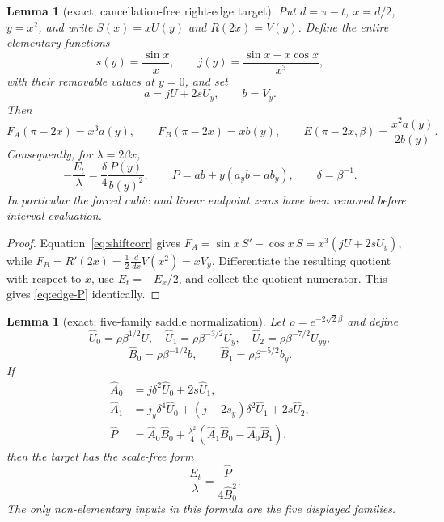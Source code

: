 \documentclass[11pt]{article}
\newtheorem{lemma}[theorem]{Lemma}
\theoremstyle{remark}
\newcommand{\FA}{F_{\!A}}
\newcommand{\FB}{F_{\!B}}
\newcommand{\dd}{\,d}
\begin{document}
\begin{lemma}[exact; cancellation-free right-edge target]
\label{lem:edge-divdiff}
Put $d=\pi-t$, $x=d/2$, $y=x^2$, and write
$S(x)=xU(y)$ and $R(2x)=V(y)$.  Define the entire elementary functions
\[
 s(y)=\frac{\sin x}{x},\qquad
 j(y)=\frac{\sin x-x\cos x}{x^3},
\]
with their removable values at $y=0$, and set
\[
 a=jU+2sU_y,\qquad b=V_y.
\]
Then
\[
 \FA(\pi-2x)=x^3a(y),\qquad
 \FB(\pi-2x)=xb(y),\qquad
 E(\pi-2x,\beta)=\frac{x^2a(y)}{2b(y)}.
\]
Consequently, for $\lambda=2\beta x$,
\begin{equation}\label{eq:edge-P}
 -\frac{E_t}{\lambda}
 =\frac{\delta}{4}\frac{P(y)}{b(y)^2},\qquad
 P=ab+y(a_yb-ab_y),\qquad \delta=\beta^{-1}.
\end{equation}
In particular the forced cubic and linear endpoint zeros have been removed
before interval evaluation.
\end{lemma}

\begin{proof}
Equation~\eqref{eq:shiftcorr} gives
$\FA=\sin x\,S'-\cos x\,S=x^3(jU+2sU_y)$, while
$\FB=R'(2x)=\tfrac12\frac{\dd}{\dd x}V(x^2)=xV_y$.
Differentiate the resulting quotient with respect to $x$, use
$E_t=-E_x/2$, and collect the quotient numerator.  This gives
\eqref{eq:edge-P} identically.
\end{proof}

\begin{lemma}[exact; five-family saddle normalization]
\label{lem:edge-five-scale}
Let $\rho=e^{-2\sqrt2\beta}$ and define
\[
 \widehat U_0=\rho\beta^{1/2}U,\quad
 \widehat U_1=\rho\beta^{-3/2}U_y,\quad
 \widehat U_2=\rho\beta^{-7/2}U_{yy},
\]
\[
 \widehat B_0=\rho\beta^{-1/2}b,\qquad
 \widehat B_1=\rho\beta^{-5/2}b_y.
\]
If
\begin{align*}
 \widehat A_0&=j\delta^2\widehat U_0+2s\widehat U_1,\\
 \widehat A_1&=j_y\delta^4\widehat U_0
 +(j+2s_y)\delta^2\widehat U_1+2s\widehat U_2,\\
 \widehat P&=\widehat A_0\widehat B_0
 +\frac{\lambda^2}{4}
 (\widehat A_1\widehat B_0-\widehat A_0\widehat B_1),
\end{align*}
then the target has the scale-free form
\begin{equation}\label{eq:edge-five-scale}
 -\frac{E_t}{\lambda}=\frac{\widehat P}{4\widehat B_0^2}.
\end{equation}
The only non-elementary inputs in this formula are the five displayed
families.
\end{lemma}
\end{document}
